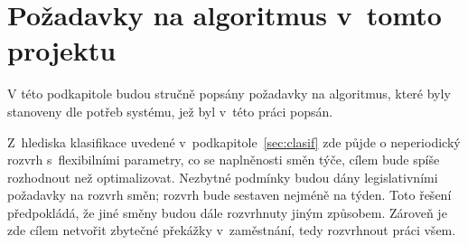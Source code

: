 \documentclass[twoside]{ctuthesis}
\begin{document}
%
%
%

\newpage

\section{Požadavky na algoritmus v~tomto projektu}
V této podkapitole budou stručně popsány požadavky na algoritmus, které byly stanoveny dle potřeb systému, jež byl v~této práci popsán.

Z~hlediska klasifikace uvedené v~podkapitole~\ref{sec:clasif} zde půjde o neperiodický rozvrh s~flexibilními parametry, co se naplněnosti směn týče, cílem bude spíše rozhodnout než optimalizovat. Nezbytné podmínky budou dány legislativními požadavky na rozvrh směn; rozvrh bude sestaven nejméně na týden. Toto řešení předpokládá, že jiné směny budou dále rozvrhnuty jiným způsobem. Zároveň je zde cílem netvořit zbytečné překážky v~zaměstnání, tedy rozvrhnout práci všem.
\end{document}

